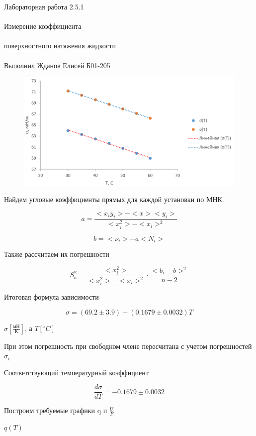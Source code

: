\documentclass{astroedu-lab}
\begin{document}
\begin{problem}{\huge Лабораторная работа 2.5.1\\\\Измерение коэффициента\\\\поверхностного натяжения жидкости\\\\Выполнил Жданов Елисей Б01-205}
\begin{figure}[!h]
	\centering
	\includegraphics[width=1\textwidth]{2023-02-23_22-55-47.png}
	\label{fig:boiler}
\end{figure}

Найдем угловые коэффициенты прямых для каждой установки по МНК.

\[
	a = \frac{<x_i y_i> - < x > < y_i >}{< x_i^2> - < x_i >^2}
\]

\[
	b = < \nu_i > - a < N_i >
\]

Также рассчитаем их погрешности

\begin{equation}
	S_a^2 = \frac{< x_i^2>}{< x_i^2 > - < x_i >^2} \cdot \frac{<  b_i - b > ^2}{n - 2}
\end{equation}

Итоговая формула зависимости

\[
	\sigma = (69.2 \pm 3.9) - (0.1679 \pm 0.0032)T
\]

\begin{center}
	$\sigma \left[ \frac{\text{мН}}{\text{К}} \right]$, а $T \left[ ^\circ C \right]$
\end{center}

При этом погрешность при свободном члене пересчитана с учетом погрешностей $\sigma_i$

Соответствующий температурный коэффициент

\begin{equation}
	\frac{d \sigma}{d T} = -0.1679 \pm 0.0032 
\end{equation}

Построим требуемые графики q и $\frac{U}{F}$

\newpage

\begin{center}
	\Large $q(T)$
\end{center}


\end{problem}
\end{document}
